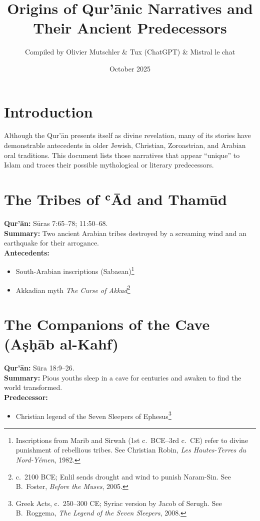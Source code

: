 \documentclass[11pt,a4paper]{article}
\title{\textbf{Origins of Qur’ānic Narratives and Their Ancient Predecessors}}
\author{Compiled by Olivier Mutschler \& Tux (ChatGPT) \& Mistral le chat}
\date{October 2025}
\begin{document}
\maketitle

\section*{Introduction}
Although the Qur’ān presents itself as divine revelation, many of its stories have demonstrable antecedents in older Jewish, Christian, Zoroastrian, and Arabian oral traditions.  
This document lists those narratives that appear “unique” to Islam and traces their possible mythological or literary predecessors.


\section{The Tribes of ʿĀd and Thamūd}
\textbf{Qur’ān:} Sūras 7:65–78; 11:50–68.\\
\textbf{Summary:} Two ancient Arabian tribes destroyed by a screaming wind and an earthquake for their arrogance.\\
\textbf{Antecedents:}
\begin{itemize}
  \item South-Arabian inscriptions (Sabaean)\footnote{Inscriptions from Marib and Sirwah (1st c.\ BCE–3rd c.\ CE) refer to divine punishment of rebellious tribes. See Christian Robin, \emph{Les Hautes-Terres du Nord-Yémen}, 1982.}
  \item Akkadian myth \emph{The Curse of Akkad}\footnote{c.\ 2100 BCE; Enlil sends drought and wind to punish Naram-Sin. See B.\ Foster, \emph{Before the Muses}, 2005.}
\end{itemize}

\section{The Companions of the Cave (Aṣḥāb al-Kahf)}
\textbf{Qur’ān:} Sūra 18:9–26.\\
\textbf{Summary:} Pious youths sleep in a cave for centuries and awaken to find the world transformed.\\
\textbf{Predecessor:}
\begin{itemize}
  \item Christian legend of the Seven Sleepers of Ephesus\footnote{Greek Acts, c.\ 250–300 CE; Syriac version by Jacob of Serugh. See B.\ Roggema, \emph{The Legend of the Seven Sleepers}, 2008.}
\end{itemize}
\end{document}
